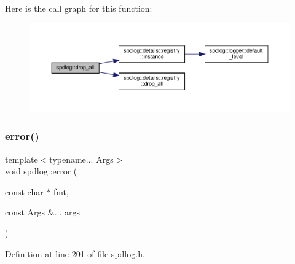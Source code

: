 Here is the call graph for this function\+:
\nopagebreak
\begin{figure}[H]
\begin{center}
\leavevmode
\includegraphics[width=350pt]{namespacespdlog_ab1211636fc47637f4dc5ee9a18aa1bce_cgraph}
\end{center}
\end{figure}
\mbox{\label{namespacespdlog_a84fc1d0e60ec7d333fd4f299f9c1e6b2}} 
\subsubsection{\texorpdfstring{error()}{error()}\hspace{0.1cm}{\footnotesize\ttfamily [1/2]}}
{\footnotesize\ttfamily template$<$typename... Args$>$ \\
void spdlog\+::error (\begin{DoxyParamCaption}\item[{const char $\ast$}]{fmt,  }\item[{const Args \&...}]{args }\end{DoxyParamCaption})\hspace{0.3cm}{\ttfamily [inline]}}



Definition at line 201 of file spdlog.\+h.

